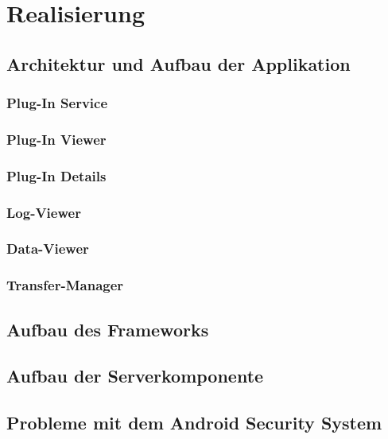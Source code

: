 \chapter{Realisierung}
\label{cha:realisierung}

\section{Architektur und Aufbau der Applikation}
\subsection{Plug-In Service}
\subsection{Plug-In Viewer}
\subsection{Plug-In Details}
\subsection{Log-Viewer}
\subsection{Data-Viewer}
\subsection{Transfer-Manager}

\section{Aufbau des Frameworks}

\section{Aufbau der Serverkomponente}

\section{Probleme mit dem Android Security System}